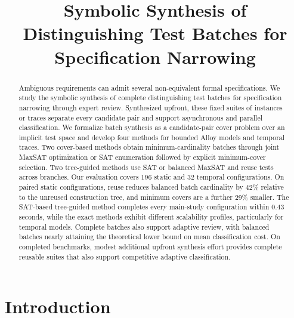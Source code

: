 \documentclass[runningheads]{llncs}
\newif\ifanonymous
\begin{document}
\title{Symbolic Synthesis of Distinguishing Test Batches for Specification Narrowing}

\ifanonymous
  \author{Anonymous Authors}
  \authorrunning{Anonymous Authors}
  \institute{}
\fi

\maketitle

\begin{abstract}
Ambiguous requirements can admit several non-equivalent formal specifications.
We study the symbolic synthesis of complete distinguishing test batches for
specification narrowing through expert review. Synthesized upfront, these fixed
suites of instances or traces separate every candidate pair and support
asynchronous and parallel classification. We formalize
batch synthesis as a candidate-pair cover problem over an implicit test space
and develop four methods for bounded Alloy models and temporal traces. Two
cover-based methods obtain minimum-cardinality batches through joint MaxSAT
optimization or SAT enumeration followed by explicit minimum-cover selection.
Two tree-guided methods use SAT or balanced MaxSAT and reuse tests across
branches. Our evaluation covers 196 static and 32 temporal configurations.
On paired static configurations, reuse reduces balanced batch cardinality by
42\% relative to the unreused construction tree, and minimum covers are a
further 29\% smaller. The SAT-based tree-guided method completes every
main-study configuration within 0.43 seconds, while the exact methods exhibit
different scalability profiles, particularly for temporal models. Complete
batches also support adaptive review, with balanced batches nearly attaining the
theoretical lower bound on mean classification cost. On completed benchmarks,
modest additional upfront synthesis effort provides complete reusable suites
that also support competitive adaptive classification.

\end{abstract}

\section{Introduction}
\label{sec:introduction}
\end{document}
